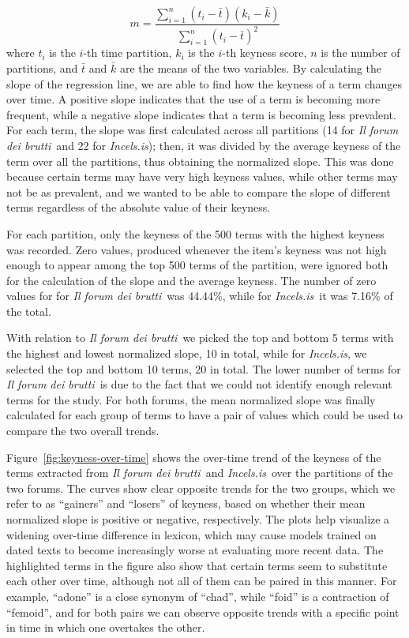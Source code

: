 \documentclass[11pt]{article}
\newcommand{\enforum}{\textit{Incels.is}}
\newcommand{\itforum}{\textit{Il forum dei brutti}}
\begin{document}
\begin{equation}
  \label{eq:slope}
  m = \frac{\sum_{i=1}^{n} (t_i - \bar{t})(k_i - \bar{k})}{\sum_{i=1}^{n} (t_i - \bar{t})^2}
\end{equation}
where $t_i$ is the $i$-th time partition, $k_i$ is the $i$-th keyness score, $n$ is the number of partitions, and $\bar{t}$ and $\bar{k}$ are the means of the two variables. By calculating the slope of the regression line, we are able to find how the keyness of a term changes over time. A positive slope indicates that the use of a term is becoming more frequent, while a negative slope indicates that a term is becoming less prevalent. For each term, the slope was first calculated across all partitions (14 for \itforum\, and 22 for \enforum); then, it was divided by the average keyness of the term over all the partitions, thus obtaining the normalized slope. This was done because certain terms may have very high keyness values, while other terms may not be as prevalent, and we wanted to be able to compare the slope of different terms regardless of the absolute value of their keyness.

For each partition, only the keyness of the 500 terms with the highest keyness was recorded. Zero values, produced whenever the item's keyness was not high enough to appear among the top 500 terms of the partition, were ignored both for the calculation of the slope and the average keyness. The number of zero values for for \itforum\, was 44.44\%, while for \enforum\, it was 7.16\% of the total.

With relation to \itforum\, we picked the top and bottom 5 terms with the highest and lowest normalized slope, 10 in total, while for \enforum, we selected the top and bottom 10 terms, 20 in total. The lower number of terms for \itforum\, is due to the fact that we could not identify enough relevant terms for the study. For both forums, the mean normalized slope was finally calculated for each group of terms to have a pair of values which could be used to compare the two overall trends.

Figure~\ref{fig:keyness-over-time} shows the over-time trend of the keyness of the terms extracted from \itforum\, and \enforum\, over the partitions of the two forums. The curves show clear opposite trends for the two groups, which we refer to as ``gainers'' and ``losers'' of keyness, based on whether their mean normalized slope is positive or negative, respectively. The plots help visualize a widening over-time difference in lexicon, which may cause models trained on dated texts to become increasingly worse at evaluating more recent data. The highlighted terms in the figure also show that certain terms seem to substitute each other over time, although not all of them can be paired in this manner. For example, ``adone'' is a close synonym of ``chad'', while ``foid'' is a contraction of ``femoid'', and for both pairs we can observe opposite trends with a specific point in time in which one overtakes the other.
\end{document}
